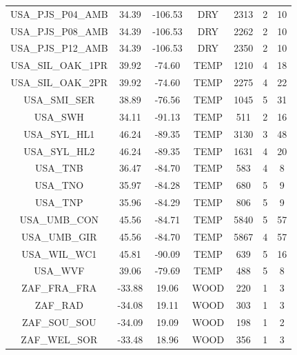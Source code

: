 \documentclass[11pt,twoside]{reedthesis}
\begin{document}
\begin{longtable}[t]{ccccccc}
USA\_PJS\_P04\_AMB & 34.39 & -106.53 & DRY & 2313 & 2 & 10\\
USA\_PJS\_P08\_AMB & 34.39 & -106.53 & DRY & 2262 & 2 & 10\\
USA\_PJS\_P12\_AMB & 34.39 & -106.53 & DRY & 2350 & 2 & 10\\
USA\_SIL\_OAK\_1PR & 39.92 & -74.60 & TEMP & 1210 & 4 & 18\\
USA\_SIL\_OAK\_2PR & 39.92 & -74.60 & TEMP & 2275 & 4 & 22\\
USA\_SMI\_SER & 38.89 & -76.56 & TEMP & 1045 & 5 & 31\\
USA\_SWH & 34.11 & -91.13 & TEMP & 511 & 2 & 16\\
USA\_SYL\_HL1 & 46.24 & -89.35 & TEMP & 3130 & 3 & 48\\
USA\_SYL\_HL2 & 46.24 & -89.35 & TEMP & 1631 & 4 & 20\\
USA\_TNB & 36.47 & -84.70 & TEMP & 583 & 4 & 8\\
USA\_TNO & 35.97 & -84.28 & TEMP & 680 & 5 & 9\\
USA\_TNP & 35.96 & -84.29 & TEMP & 806 & 5 & 9\\
USA\_UMB\_CON & 45.56 & -84.71 & TEMP & 5840 & 5 & 57\\
USA\_UMB\_GIR & 45.56 & -84.70 & TEMP & 5867 & 4 & 57\\
USA\_WIL\_WC1 & 45.81 & -90.09 & TEMP & 639 & 5 & 16\\
USA\_WVF & 39.06 & -79.69 & TEMP & 488 & 5 & 8\\
ZAF\_FRA\_FRA & -33.88 & 19.06 & WOOD & 220 & 1 & 3\\
ZAF\_RAD & -34.08 & 19.11 & WOOD & 303 & 1 & 3\\
ZAF\_SOU\_SOU & -34.09 & 19.09 & WOOD & 198 & 1 & 2\\
ZAF\_WEL\_SOR & -33.48 & 18.96 & WOOD & 356 & 1 & 3\\*
\end{longtable}
\endgroup{} \newpage
\end{document}
